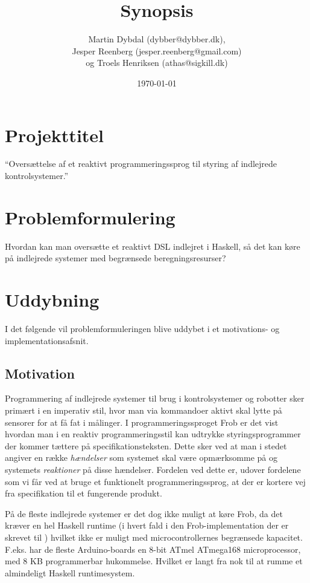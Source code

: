 \documentclass[a4paper,oneside, draft]{memoir}
\title{Synopsis}
\author{Martin Dybdal (dybber@dybber.dk), \\
Jesper Reenberg (jesper.reenberg@gmail.com) \\ og
Troels Henriksen (athas@sigkill.dk)}
\date{\today}
\begin{document}
\maketitle

\section{Projekttitel}
"`Oversættelse af et reaktivt programmeringssprog til styring af
indlejrede kontrolsystemer."'

\section{Problemformulering}
Hvordan kan man oversætte et reaktivt DSL indlejret i Haskell, så det
kan køre på indlejrede systemer med begrænsede beregningsresurser?

\section{Uddybning}

I det følgende vil problemformuleringen blive uddybet i et motivations- og
implementationsafsnit.

\subsection{Motivation}
Programmering af indlejrede systemer til brug i kontrolsystemer og
robotter sker primært i en imperativ stil, hvor man via kommandoer
aktivt skal lytte på sensorer for at få fat i målinger. I
programmeringssproget Frob\cite{frob99} er det vist hvordan man i en reaktiv
programmeringsstil kan udtrykke styringsprogrammer der kommer tættere
på specifikationsteksten. Dette sker ved at man i stedet angiver en
række \textit{hændelser} som systemet skal være opmærksomme på og
systemets \textit{reaktioner} på disse hændelser. Fordelen ved dette
er, udover fordelene som vi får ved at bruge et funktionelt
programmeringssprog, at der er kortere vej fra specifikation til et
fungerende produkt.

På de fleste indlejrede systemer er det dog ikke muligt at køre Frob,
da det kræver en hel Haskell runtime (i hvert fald i den
Frob-implementation der er skrevet til \cite{frob99}) hvilket ikke er muligt med
microcontrollernes begrænsede kapacitet.  F.eks. har de fleste
Arduino-boards en 8-bit ATmel ATmega168 microprocessor, med 8 KB
programmerbar hukommelse. Hvilket er langt fra nok til at rumme et
almindeligt Haskell runtimesystem.
\end{document}
